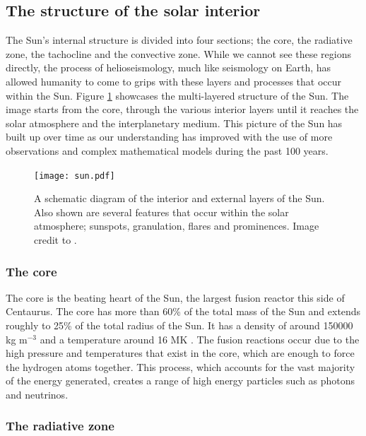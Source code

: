 \subsection{The structure of the solar interior}

    The Sun's internal structure is divided into four sections; the core, the radiative zone, the tachocline and the convective zone.
    While we cannot see these regions directly, the process of helioseismology, much like seismology on Earth, has allowed humanity to come to grips with these layers and processes that occur within the Sun.
    Figure \ref{fig:Sun} showcases the multi-layered structure of the Sun.
    The image starts from the core, through the various interior layers until it reaches the solar atmosphere and the interplanetary medium.
    This picture of the Sun has built up over time as our understanding has improved with the use of more observations and complex mathematical models during the past 100 years.
    
    \begin{figure}
        \centering
        \texttt{[image: sun.pdf]}
        \caption{
                A schematic diagram of the interior and external layers of the Sun.
                Also shown are several features that occur within the solar atmosphere; sunspots, granulation, flares and prominences.
                Image credit to \cite{sun_image}.
               }
        \label{fig:Sun}
    \end{figure}

\subsubsection{The core}

    The core is the beating heart of the Sun, the largest fusion reactor this side of Centaurus.
    The core has more than 60\% of the total mass of the Sun and extends roughly to 25\% of the total radius of the Sun.
    It has a density of around 150000 kg m$^{-3}$ and a temperature around 16 MK \citep{0004-637X-699-2-1403}.
    The fusion reactions occur due to the high pressure and temperatures that exist in the core, which are enough to force the hydrogen atoms together. 
    This process, which accounts for the vast majority of the energy generated, creates a range of high energy particles such as photons and neutrinos.
    
\subsubsection{The radiative zone}

